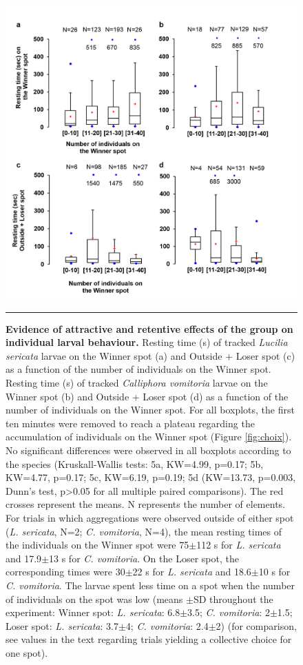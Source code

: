 \begin{figure}[p]
\centering
		\includegraphics[width=1 \textwidth]{Figures/groupeffect.png}
		\rule{35em}{0.5pt}
		\caption[Groupeffect]{\textbf{Evidence of attractive and retentive effects of the group on individual larval behaviour.} Resting time (s) of tracked \textit{Lucilia sericata} larvae on the Winner spot (a) and Outside + Loser spot (c) as a function of the number of individuals on the Winner spot. Resting time (s) of tracked \textit{Calliphora vomitoria} larvae on the Winner spot (b) and Outside + Loser spot (d) as a function of the number of individuals on the Winner spot. For all boxplots, the first ten minutes were removed to reach a plateau regarding the accumulation of individuals on the Winner spot (Figure \ref{fig:choix}). No significant differences were observed in all boxplots according to the species (Kruskall-Wallis tests: 5a, KW=4.99, p=0.17; 5b, KW=4.77, p=0.17; 5c, KW=6.19, p=0.19; 5d (KW=13.73, p=0.003, Dunn’s test, p>0.05 for all multiple paired comparisons). The red crosses represent the means. N represents the number of elements. For trials in which aggregations were observed outside of either spot (\textit{L. sericata}, N=2; \textit{C. vomitoria}, N=4), the mean resting times of the individuals on the Winner spot were 75$\pm$112 s for \textit{L. sericata} and 17.9$\pm$13 s for \textit{C. vomitoria}. On the Loser spot, the corresponding times were 30$\pm$22 s for \textit{L. sericata} and 18.6$\pm$10 s for \textit{C. vomitoria}. The larvae spent less time on a spot when the number of individuals on the spot was low (means $\pm$SD throughout the experiment: Winner spot: \textit{L. sericata}: 6.8$\pm$3.5; \textit{C. vomitoria}: 2$\pm$1.5; Loser spot: \textit{L. sericata}: 3.7$\pm$4; \textit{C. vomitoria}: 2.4$\pm$2) (for comparison, see values in the text regarding trials yielding a collective choice for one spot).}
	\label{fig:groupeffect}
\end{figure}

